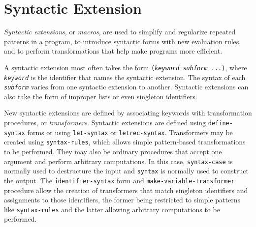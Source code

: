 \chapter{Syntactic Extension\label{syntax_CHPTSYNTAX}}
\label{syntax_g133}
\label{syntax_h0}
\begin{figure}[H]
\centering
\setlength{\fboxrule}{3pt}
\end{figure}
\clearpage





\label{syntax_s0}\label{syntax_s1}\textit{Syntactic extensions},
or \label{syntax_s2}\textit{macros}, are used to simplify and regularize
repeated patterns in a program, to introduce syntactic forms with
new evaluation rules, and to perform transformations that help make
programs more efficient.


A syntactic extension most often takes the form
\texttt{(\textit{keyword} \textit{subform} ...)},
where \texttt{\textit{keyword}} is the identifier that names the syntactic
extension.
The syntax of each \texttt{\textit{subform}} varies from one syntactic
extension to another.
Syntactic extensions can also take the form of improper lists
or even singleton identifiers.


New syntactic extensions are defined by associating keywords with
transformation procedures, or \textit{transformers}.
Syntactic extensions are defined using
\label{syntax_s3}\texttt{define-syntax} forms or
using
\label{syntax_s4}\texttt{let-syntax} or
\label{syntax_s5}\texttt{letrec-syntax}.
Transformers may be created using
\label{syntax_s6}\texttt{syntax-rules}, which
allows simple pattern-based transformations to be performed.
They may also be ordinary procedures that accept one argument and
perform arbitrary computations.
In this case, \label{syntax_s7}\texttt{syntax-case} is normally used
to destructure the input and
\label{syntax_s8}\texttt{syntax} is normally
used to construct the output.
The \label{syntax_s9}\texttt{identifier-syntax}
form and
\label{syntax_s10}\texttt{make-variable-transformer}
procedure allow the creation of transformers that match singleton
identifiers and assignments to those identifiers, the former being
restricted to simple patterns like \texttt{syntax-rules} and the
latter allowing arbitrary computations to be performed.


